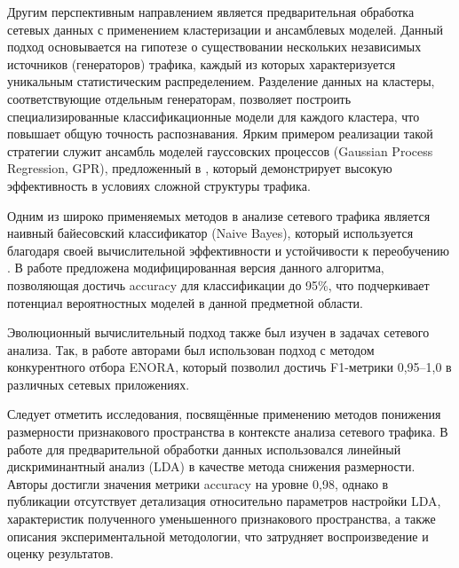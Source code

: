 Другим перспективным направлением является предварительная обработка сетевых данных с применением кластеризации и ансамблевых моделей. Данный подход основывается на гипотезе о существовании нескольких независимых источников (генераторов) трафика, каждый из которых характеризуется уникальным статистическим распределением. Разделение данных на кластеры, соответствующие отдельным генераторам, позволяет построить специализированные классификационные модели для каждого кластера, что повышает общую точность распознавания. Ярким примером реализации такой стратегии служит ансамбль моделей гауссовских процессов (Gaussian Process Regression, GPR), предложенный в \cite{Bayati2020}, который демонстрирует высокую эффективность в условиях сложной структуры трафика.

Одним из широко применяемых методов в анализе сетевого трафика является наивный байесовский классификатор (Naive Bayes), который используется благодаря своей вычислительной эффективности и устойчивости к переобучению \cite{Athanasios2019, Sharafaldin2018TowardGA}. В работе \cite{moore2005} предложена модифицированная версия данного алгоритма, позволяющая достичь accuracy для классификации до 95\%, что подчеркивает потенциал вероятностных моделей в данной предметной области.

Эволюционный вычислительный подход также был изучен в задачах сетевого анализа. Так, в работе \cite{Fernando2015} авторами был использован подход с методом конкурентного отбора ENORA, который позволил достичь F1-метрики 0,95–1,0 в различных сетевых приложениях.

Следует отметить исследования, посвящённые применению методов понижения размерности признакового пространства в контексте анализа сетевого трафика. В работе \cite{Saber2019} для предварительной обработки данных использовался линейный дискриминантный анализ (LDA) в качестве метода снижения размерности. Авторы достигли значения метрики accuracy на уровне 0,98, однако в публикации отсутствует детализация относительно параметров настройки LDA, характеристик полученного уменьшенного признакового пространства, а также описания экспериментальной методологии, что затрудняет воспроизведение и оценку результатов.

